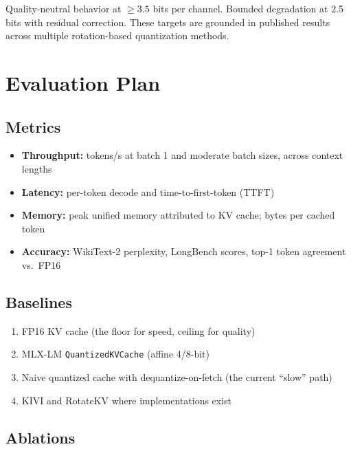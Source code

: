 \documentclass[nobib]{tufte-handout}
\begin{document}
Quality-neutral behavior at ${\ge}3.5$ bits per channel. Bounded degradation at 2.5 bits with residual correction. These targets are grounded in published results across multiple rotation-based quantization methods.


\section{Evaluation Plan}

\subsection{Metrics}

\begin{itemize}
  \item \textbf{Throughput:} tokens/s at batch 1 and moderate batch sizes, across context lengths
  \item \textbf{Latency:} per-token decode and time-to-first-token (TTFT)
  \item \textbf{Memory:} peak unified memory attributed to KV cache; bytes per cached token
  \item \textbf{Accuracy:} WikiText-2 perplexity, LongBench scores, top-1 token agreement vs.\ FP16
\end{itemize}

\subsection{Baselines}

\begin{enumerate}
  \item FP16 KV cache (the floor for speed, ceiling for quality)
  \item MLX-LM \texttt{QuantizedKVCache} (affine 4/8-bit)
  \item Naive quantized cache with dequantize-on-fetch (the current ``slow'' path)
  \item KIVI and RotateKV where implementations exist
\end{enumerate}

\subsection{Ablations}
\end{document}
